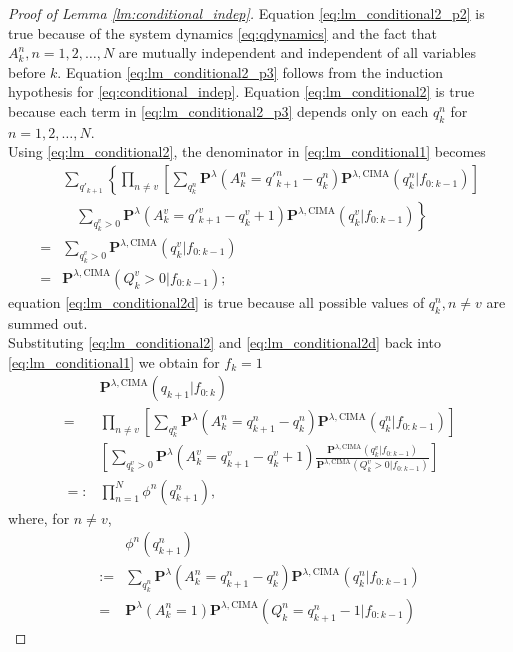 \documentclass[onecolumn,draftcls]{IEEEtran}
\newcommand{\g}{\text{CIMA}}
\begin{document}
\begin{proof}[Proof of Lemma \ref{lm:conditional_indep}]
Equation \eqref{eq:lm_conditional2_p2} is true because of the system dynamics \eqref{eq:qdynamics} and the fact that
$A^n_k, n=1,2,\dots,N$ are mutually independent and independent of all variables before $k$. 
Equation \eqref{eq:lm_conditional2_p3} follows from the induction hypothesis for \eqref{eq:conditional_indep}. 
Equation \eqref{eq:lm_conditional2} is true because each term in \eqref{eq:lm_conditional2_p3} depends only on each $q^n_k$ for $n=1,2,\dots,N$.
\\
Using \eqref{eq:lm_conditional2}, the denominator in \eqref{eq:lm_conditional1} becomes
\begin{align}
&\sum_{q'_{k+1}}\left\{
\prod_{n\neq v}\left[\sum_{q^n_k}\mathbf{P}^{\lambda}(A^n_k = q'^{n}_{k+1}-q^n_{k})\mathbf{P}^{\lambda,\g}(q^n_{k}|f_{0:k-1}) \right]
\right.
\nonumber\\
&\quad\left.
\sum_{q^{v}_{k}>0}\mathbf{P}^{\lambda}(A^v_k = q'^{v}_{k+1}-q^v_{k}+1)
\mathbf{P}^{\lambda,\g}(q^v_{k}|f_{0:k-1})\right\}
\nonumber\\
=&
\sum_{q^{v}_{k}>0}\mathbf{P}^{\lambda,\g}(q^v_{k}|f_{0:k-1})\nonumber\\
=&
\mathbf{P}^{\lambda,\g}(Q^v_{k}>0|f_{0:k-1});
\label{eq:lm_conditional2d}
\end{align}
equation \eqref{eq:lm_conditional2d} is true because all possible values of $q^n_k,n\neq v$ are summed out.
\\
Substituting \eqref{eq:lm_conditional2} and \eqref{eq:lm_conditional2d} back into \eqref{eq:lm_conditional1} we obtain for $f_k=1$
\begin{align}
&\mathbf{P}^{\lambda,\g}(q_{k+1}|f_{0:k})\nonumber\\
=
&\prod_{n\neq v}\left[\sum_{q^n_k}\mathbf{P}^{\lambda}(A^n_k = q^n_{k+1}-q^n_{k})\mathbf{P}^{\lambda,\g}(q^n_{k}|f_{0:k-1}) \right]
\nonumber\\
&
\left[\sum_{q^{v}_{k}>0}\mathbf{P}^{\lambda}(A^v_k = q^v_{k+1}-q^v_{k}+1)
\frac{\mathbf{P}^{\lambda,\g}(q^v_{k}|f_{0:k-1})}{\mathbf{P}^{\lambda,\g}(Q^v_{k}>0|f_{0:k-1})}\right]
\nonumber\\
=: & \prod_{n=1}^N \phi^n(q^n_{k+1}),
\label{eq:lm_conditional2r}
\end{align}
where, for $n\neq v$,
\begin{align}
&\phi^n(q^n_{k+1})\nonumber\\
:=&
\sum_{q^n_k}\mathbf{P}^{\lambda}(A^n_k = q^n_{k+1}-q^n_{k})\mathbf{P}^{\lambda,\g}(q^n_{k}|f_{0:k-1}) \nonumber\\
=&\mathbf{P}^{\lambda}(A^n_k = 1)\mathbf{P}^{\lambda,\g}(Q^n_k = q^n_{k+1}-1|f_{0:k-1})

\end{align}
\end{proof}
\end{document}
